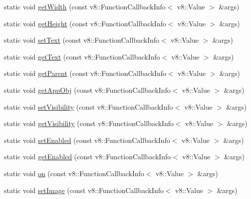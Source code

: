 \begin{DoxyCompactItemize}
static void \mbox{\hyperlink{class_rad_j_a_v_1_1_g_u_i_1_1_image_a5ad664fa7db764d0b0da2ae31d9de4cc}{get\+Width}} (const v8\+::\+Function\+Callback\+Info$<$ v8\+::\+Value $>$ \&args)
\item 
static void \mbox{\hyperlink{class_rad_j_a_v_1_1_g_u_i_1_1_image_a6810870aac69f53376cc24e93a4dbd98}{get\+Height}} (const v8\+::\+Function\+Callback\+Info$<$ v8\+::\+Value $>$ \&args)
\item 
static void \mbox{\hyperlink{class_rad_j_a_v_1_1_g_u_i_1_1_image_a91ea76ac7c12ea1b01a7b62b35149509}{set\+Text}} (const v8\+::\+Function\+Callback\+Info$<$ v8\+::\+Value $>$ \&args)
\item 
static void \mbox{\hyperlink{class_rad_j_a_v_1_1_g_u_i_1_1_image_a7f3fe4c2db70a03640ad6519a9e50d73}{get\+Text}} (const v8\+::\+Function\+Callback\+Info$<$ v8\+::\+Value $>$ \&args)
\item 
static void \mbox{\hyperlink{class_rad_j_a_v_1_1_g_u_i_1_1_image_afd5ff8dcafc0ab85891755bd58611870}{get\+Parent}} (const v8\+::\+Function\+Callback\+Info$<$ v8\+::\+Value $>$ \&args)
\item 
static void \mbox{\hyperlink{class_rad_j_a_v_1_1_g_u_i_1_1_image_a5a8b34ce9bccc5e9bd9ae23ad3f07585}{get\+App\+Obj}} (const v8\+::\+Function\+Callback\+Info$<$ v8\+::\+Value $>$ \&args)
\item 
static void \mbox{\hyperlink{class_rad_j_a_v_1_1_g_u_i_1_1_image_ac210b50acae9b6cf78ec0d4b47305074}{set\+Visibility}} (const v8\+::\+Function\+Callback\+Info$<$ v8\+::\+Value $>$ \&args)
\item 
static void \mbox{\hyperlink{class_rad_j_a_v_1_1_g_u_i_1_1_image_a0e6559ae04df3393f1afa2fed305b165}{get\+Visibility}} (const v8\+::\+Function\+Callback\+Info$<$ v8\+::\+Value $>$ \&args)
\item 
static void \mbox{\hyperlink{class_rad_j_a_v_1_1_g_u_i_1_1_image_aaa380c8ba5253eadd040b943ef78afae}{set\+Enabled}} (const v8\+::\+Function\+Callback\+Info$<$ v8\+::\+Value $>$ \&args)
\item 
static void \mbox{\hyperlink{class_rad_j_a_v_1_1_g_u_i_1_1_image_a2fdd66448f0821aa5e17c56de1220f71}{get\+Enabled}} (const v8\+::\+Function\+Callback\+Info$<$ v8\+::\+Value $>$ \&args)
\item 
static void \mbox{\hyperlink{class_rad_j_a_v_1_1_g_u_i_1_1_image_a9886b0a17e7e55d62f87f20570b68a7b}{on}} (const v8\+::\+Function\+Callback\+Info$<$ v8\+::\+Value $>$ \&args)
\item 
static void \mbox{\hyperlink{class_rad_j_a_v_1_1_g_u_i_1_1_image_a895da678ec0c0f21107322e44b542a15}{set\+Image}} (const v8\+::\+Function\+Callback\+Info$<$ v8\+::\+Value $>$ \&args)
\end{DoxyCompactItemize}


